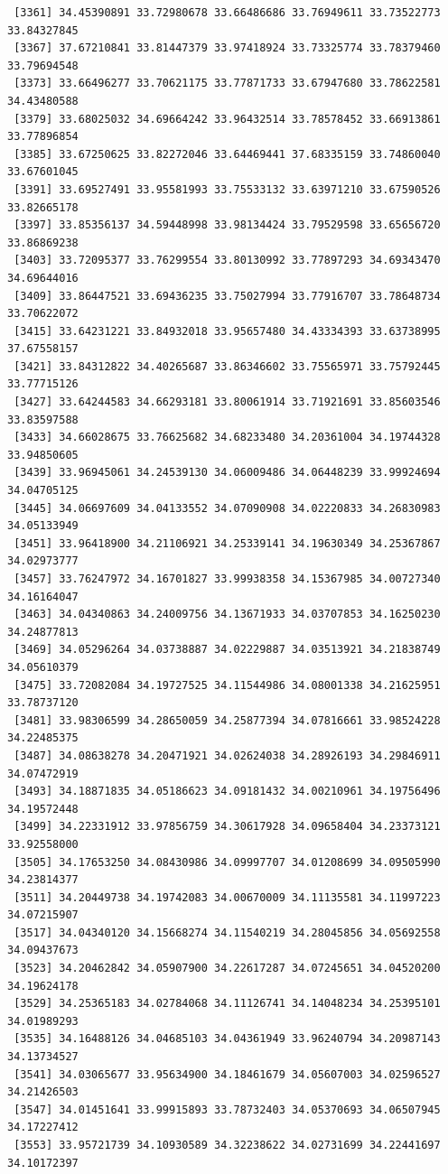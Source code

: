 \documentclass[
  letterpaper,
  DIV=11,
  numbers=noendperiod]{scrartcl}
\begin{document}
\begin{verbatim}
 [3361] 34.45390891 33.72980678 33.66486686 33.76949611 33.73522773 33.84327845
 [3367] 37.67210841 33.81447379 33.97418924 33.73325774 33.78379460 33.79694548
 [3373] 33.66496277 33.70621175 33.77871733 33.67947680 33.78622581 34.43480588
 [3379] 33.68025032 34.69664242 33.96432514 33.78578452 33.66913861 33.77896854
 [3385] 33.67250625 33.82272046 33.64469441 37.68335159 33.74860040 33.67601045
 [3391] 33.69527491 33.95581993 33.75533132 33.63971210 33.67590526 33.82665178
 [3397] 33.85356137 34.59448998 33.98134424 33.79529598 33.65656720 33.86869238
 [3403] 33.72095377 33.76299554 33.80130992 33.77897293 34.69343470 34.69644016
 [3409] 33.86447521 33.69436235 33.75027994 33.77916707 33.78648734 33.70622072
 [3415] 33.64231221 33.84932018 33.95657480 34.43334393 33.63738995 37.67558157
 [3421] 33.84312822 34.40265687 33.86346602 33.75565971 33.75792445 33.77715126
 [3427] 33.64244583 34.66293181 33.80061914 33.71921691 33.85603546 33.83597588
 [3433] 34.66028675 33.76625682 34.68233480 34.20361004 34.19744328 33.94850605
 [3439] 33.96945061 34.24539130 34.06009486 34.06448239 33.99924694 34.04705125
 [3445] 34.06697609 34.04133552 34.07090908 34.02220833 34.26830983 34.05133949
 [3451] 33.96418900 34.21106921 34.25339141 34.19630349 34.25367867 34.02973777
 [3457] 33.76247972 34.16701827 33.99938358 34.15367985 34.00727340 34.16164047
 [3463] 34.04340863 34.24009756 34.13671933 34.03707853 34.16250230 34.24877813
 [3469] 34.05296264 34.03738887 34.02229887 34.03513921 34.21838749 34.05610379
 [3475] 33.72082084 34.19727525 34.11544986 34.08001338 34.21625951 33.78737120
 [3481] 33.98306599 34.28650059 34.25877394 34.07816661 33.98524228 34.22485375
 [3487] 34.08638278 34.20471921 34.02624038 34.28926193 34.29846911 34.07472919
 [3493] 34.18871835 34.05186623 34.09181432 34.00210961 34.19756496 34.19572448
 [3499] 34.22331912 33.97856759 34.30617928 34.09658404 34.23373121 33.92558000
 [3505] 34.17653250 34.08430986 34.09997707 34.01208699 34.09505990 34.23814377
 [3511] 34.20449738 34.19742083 34.00670009 34.11135581 34.11997223 34.07215907
 [3517] 34.04340120 34.15668274 34.11540219 34.28045856 34.05692558 34.09437673
 [3523] 34.20462842 34.05907900 34.22617287 34.07245651 34.04520200 34.19624178
 [3529] 34.25365183 34.02784068 34.11126741 34.14048234 34.25395101 34.01989293
 [3535] 34.16488126 34.04685103 34.04361949 33.96240794 34.20987143 34.13734527
 [3541] 34.03065677 33.95634900 34.18461679 34.05607003 34.02596527 34.21426503
 [3547] 34.01451641 33.99915893 33.78732403 34.05370693 34.06507945 34.17227412
 [3553] 33.95721739 34.10930589 34.32238622 34.02731699 34.22441697 34.10172397

\end{verbatim}
\end{document}
